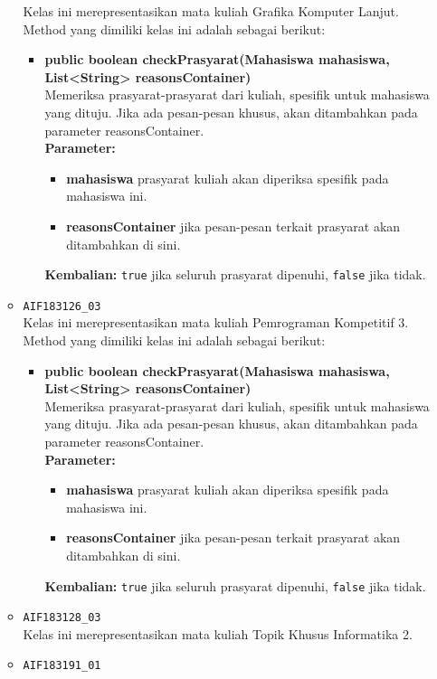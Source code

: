 \begin{enumerate}
\begin{itemize}
		Kelas ini merepresentasikan mata kuliah Grafika Komputer Lanjut. Method yang dimiliki kelas ini adalah sebagai berikut: 
		\begin{itemize}
			\item \textbf{public boolean checkPrasyarat(Mahasiswa mahasiswa, List<String> reasonsContainer)}\\
			Memeriksa prasyarat-prasyarat dari kuliah, spesifik untuk mahasiswa yang dituju. Jika ada pesan-pesan khusus, akan ditambahkan pada parameter reasonsContainer.\\
			\textbf{Parameter:}
			\begin{itemize}
				\item \textbf{mahasiswa} prasyarat kuliah akan diperiksa spesifik pada mahasiswa ini.
				\item \textbf{reasonsContainer} jika pesan-pesan terkait prasyarat akan ditambahkan di sini.
			\end{itemize}
			\textbf{Kembalian:} \texttt{true} jika seluruh prasyarat dipenuhi, \texttt{false} jika tidak.
		\end{itemize}
		\item \texttt{AIF183126\_03} \\
		Kelas ini merepresentasikan mata kuliah Pemrograman Kompetitif 3. Method yang dimiliki kelas ini adalah sebagai berikut: 
		\begin{itemize}
			\item \textbf{public boolean checkPrasyarat(Mahasiswa mahasiswa, List<String> reasonsContainer)}\\
			Memeriksa prasyarat-prasyarat dari kuliah, spesifik untuk mahasiswa yang dituju. Jika ada pesan-pesan khusus, akan ditambahkan pada parameter reasonsContainer.\\
			\textbf{Parameter:}
			\begin{itemize}
				\item \textbf{mahasiswa} prasyarat kuliah akan diperiksa spesifik pada mahasiswa ini.
				\item \textbf{reasonsContainer} jika pesan-pesan terkait prasyarat akan ditambahkan di sini.
			\end{itemize}
			\textbf{Kembalian:} \texttt{true} jika seluruh prasyarat dipenuhi, \texttt{false} jika tidak.
		\end{itemize}
		\item \texttt{AIF183128\_03} \\
		Kelas ini merepresentasikan mata kuliah Topik Khusus Informatika 2.
		\item \texttt{AIF183191\_01} \\

\end{itemize}
\end{enumerate}
